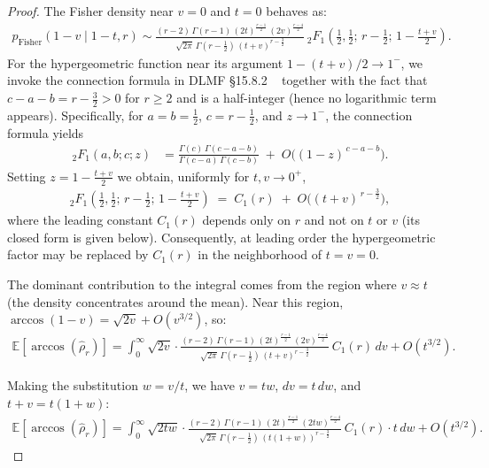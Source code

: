\begin{proof}
The Fisher density near \( v=0 \) and \( t=0 \) behaves as:
\begin{align}
p_{\text{Fisher}}(1-v \mid 1-t, r) \sim \frac{(r-2)\,\Gamma(r-1)\,(2t)^{\frac{r-1}{2}}\,(2v)^{\frac{r-4}{2}}}{\sqrt{2\pi}\,\Gamma(r-\tfrac{1}{2})\,(t+v)^{r-\frac{3}{2}}}\,{}_2F_1\!\left(\tfrac{1}{2},\tfrac{1}{2};\, r-\tfrac{1}{2};\, 1 - \tfrac{t+v}{2}\right).
\end{align}
For the hypergeometric function near its argument \( 1 - (t+v)/2 \to 1^- \), 
we invoke the connection formula in DLMF §15.8.2 ~\cite{nist_dlmf} together with the fact that
\( c-a-b = r-\tfrac{3}{2} > 0 \) for \( r\ge 2 \) and is a half-integer (hence no logarithmic term appears). 
Specifically, for \( a=b=\tfrac{1}{2} \), \( c=r-\tfrac{1}{2} \), and \( z\to 1^- \),
the connection formula yields
\begin{align}
{}_2F_1(a,b;c;z)
&= \frac{\Gamma(c)\,\Gamma(c-a-b)}{\Gamma(c-a)\,\Gamma(c-b)} \;+\; O\!\big((1-z)^{\,c-a-b}\big).
\end{align}
Setting \( z = 1 - \tfrac{t+v}{2} \) we obtain, uniformly for \( t,v\to 0^+ \),
\begin{align}
{}_2F_1\!\left(\tfrac{1}{2},\tfrac{1}{2};\, r-\tfrac{1}{2};\, 1 - \tfrac{t+v}{2}\right)
\;=\; C_1(r) \;+\; O\!\big((t+v)^{\,r-\tfrac{3}{2}}\big),
\end{align}
where the leading constant \( C_1(r) \) depends only on \( r \) and not on \( t \) or \( v \) (its closed form is given below). 
Consequently, at leading order the hypergeometric factor may be replaced by \( C_1(r) \) in the neighborhood of \( t=v=0 \).

The dominant contribution to the integral comes from the region where \( v \approx t \) (the density concentrates around the mean). Near this region, \( \arccos(1-v) = \sqrt{2v} + O(v^{3/2}) \), so:
\begin{align}
\mathbb{E}[\arccos(\hat{\rho}_r)] = \int_{0}^{\infty} \sqrt{2v} \cdot \frac{(r-2)\,\Gamma(r-1)\,(2t)^{\frac{r-1}{2}}\,(2v)^{\frac{r-4}{2}}}{\sqrt{2\pi}\,\Gamma(r-\tfrac{1}{2})\,(t+v)^{r-\frac{3}{2}}}\,C_1(r) \, dv + O(t^{3/2}).
\end{align}

Making the substitution \( w = v/t \), we have \( v = tw \), \( dv = t\,dw \), and \( t+v = t(1+w) \):
\begin{align}
\mathbb{E}[\arccos(\hat{\rho}_r)] = \int_{0}^{\infty} \sqrt{2tw} \cdot \frac{(r-2)\,\Gamma(r-1)\,(2t)^{\frac{r-1}{2}}\,(2tw)^{\frac{r-4}{2}}}{\sqrt{2\pi}\,\Gamma(r-\tfrac{1}{2})\,(t(1+w))^{r-\frac{3}{2}}}\,C_1(r) \cdot t \, dw + O(t^{3/2}).
\end{align}


\end{proof}
